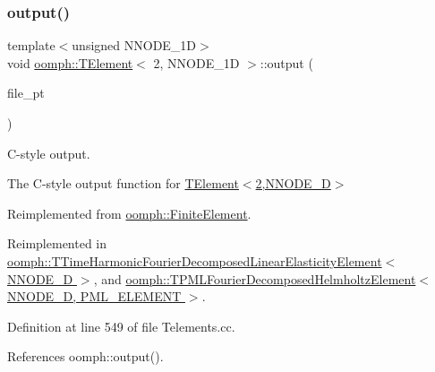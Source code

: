\mbox{\label{classoomph_1_1TElement_3_012_00_01NNODE__1D_01_4_acf3bfd1c5a6462aa9555bc8451914e63}} 
\subsubsection{\texorpdfstring{output()}{output()}\hspace{0.1cm}{\footnotesize\ttfamily [3/4]}}
{\footnotesize\ttfamily template$<$unsigned N\+N\+O\+D\+E\+\_\+1D$>$ \\
void \hyperlink{classoomph_1_1TElement}{oomph\+::\+T\+Element}$<$ 2, N\+N\+O\+D\+E\+\_\+1D $>$\+::output (\begin{DoxyParamCaption}\item[{F\+I\+LE $\ast$}]{file\+\_\+pt }\end{DoxyParamCaption})\hspace{0.3cm}{\ttfamily [virtual]}}



C-\/style output. 

The C-\/style output function for \hyperlink{classoomph_1_1TElement_3_012_00_01NNODE__1D_01_4}{T\+Element$<$2,\+N\+N\+O\+D\+E\+\_\+D$>$} 

Reimplemented from \hyperlink{classoomph_1_1FiniteElement_a72cddd09f8ddbee1a20a1ff404c6943e}{oomph\+::\+Finite\+Element}.



Reimplemented in \hyperlink{classoomph_1_1TTimeHarmonicFourierDecomposedLinearElasticityElement_a81a75203b1c0d2f110259547e51c8cac}{oomph\+::\+T\+Time\+Harmonic\+Fourier\+Decomposed\+Linear\+Elasticity\+Element$<$ N\+N\+O\+D\+E\+\_\+D $>$}, and \hyperlink{classoomph_1_1TPMLFourierDecomposedHelmholtzElement_a9fa5832723310e96902398d74e43313f}{oomph\+::\+T\+P\+M\+L\+Fourier\+Decomposed\+Helmholtz\+Element$<$ N\+N\+O\+D\+E\+\_\+D, P\+M\+L\+\_\+\+E\+L\+E\+M\+E\+N\+T $>$}.



Definition at line 549 of file Telements.\+cc.



References oomph\+::output().

\mbox{\label{classoomph_1_1TElement_3_012_00_01NNODE__1D_01_4_a9c5e3dba68906cb65e1f38eb0638080c}} 
